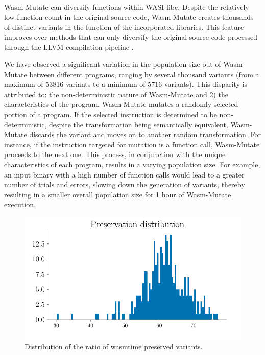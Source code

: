 \documentclass[sigplan,screen]{acmart}
\newcommand*\badge[1]{ \colorbox{red}{\color{white}#1}}
\newcommand{\tool}{{\sc Wasm-Mutate}\xspace}
\newcommand{\todo}[1]{%
\refstepcounter{todo}
\noindent\textbf{\badge{TODO}} {\color{red}#1}
\addcontentsline{td}{todo}
{\color{red}\thesection.\thetodo\xspace #1}}
\begin{document}
\tool can diversify functions within WASI-libc. 
Despite the relatively low function count in the original source code,  \tool creates thousands of distinct variants in the function of the incorporated libraries. 
This feature improves over methods that can only diversify the original source code processed through the LLVM compilation pipeline \cite{arteaga2020crow}. 



We have observed a significant variation in the population size out of \tool between different programs, ranging by several thousand variants (from a maximum of 53816 variants to a minimum of 5716 variants).
This disparity is attributed to:
the non-deterministic nature of \tool and 2) the characteristics of the program. 
\tool mutates a randomly selected portion of a program. 
If the selected instruction is determined to be non-deterministic, despite the transformation being semantically equivalent, \tool discards the variant and moves on to another random transformation.
For instance, if the instruction targeted for mutation is a function call, \tool proceeds to the next one.
This process, in conjunction with the unique characteristics of each program, results in a varying population size. 
For example, an input binary with a high number of function calls would lead to a greater number of trials and errors, slowing down the generation of variants, thereby resulting in a smaller overall population size for 1 hour of \tool execution.





\begin{figure}
    \centering
    \includegraphics[width=\linewidth]{plots/rq1/preservation.pdf}
    \caption{Distribution of the ratio of wasmtime preserved variants.}
  \label{rq1:plot:preservation}
\end{figure}
\end{document}
